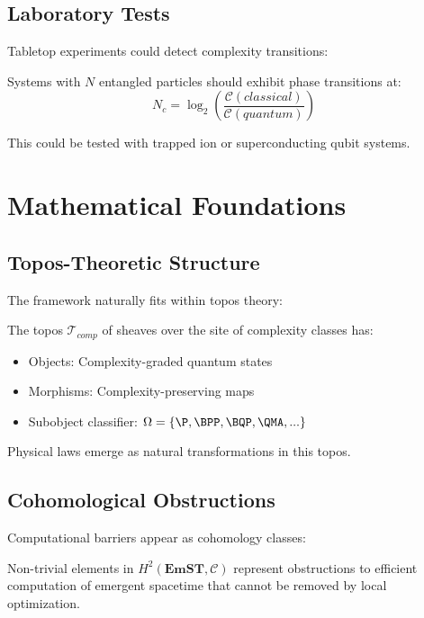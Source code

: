 \documentclass[12pt,a4paper]{article}
\newcommand{\comp}[1]{\mathcal{C}(#1)}
\newcommand{\emst}{\mathbf{EmST}}
\begin{document}
\subsection{Laboratory Tests}

Tabletop experiments could detect complexity transitions:

\begin{proposition}
Systems with $N$ entangled particles should exhibit phase transitions at:
\begin{equation}
N_c = \log_2\left(\frac{\comp{classical}}{\comp{quantum}}\right)
\end{equation}
\end{proposition}

This could be tested with trapped ion or superconducting qubit systems.

\section{Mathematical Foundations}

\subsection{Topos-Theoretic Structure}

The framework naturally fits within topos theory:

\begin{definition}
The topos $\mathcal{T}_{comp}$ of sheaves over the site of complexity classes has:
\begin{itemize}
\item Objects: Complexity-graded quantum states
\item Morphisms: Complexity-preserving maps
\item Subobject classifier: $\Omega = \{\P, \BPP, \BQP, \QMA, ...\}$
\end{itemize}
\end{definition}

Physical laws emerge as natural transformations in this topos.

\subsection{Cohomological Obstructions}

Computational barriers appear as cohomology classes:

\begin{theorem}
Non-trivial elements in $H^2(\emst, \mathcal{C})$ represent obstructions to efficient computation of emergent spacetime that cannot be removed by local optimization.
\end{theorem}
\end{document}
